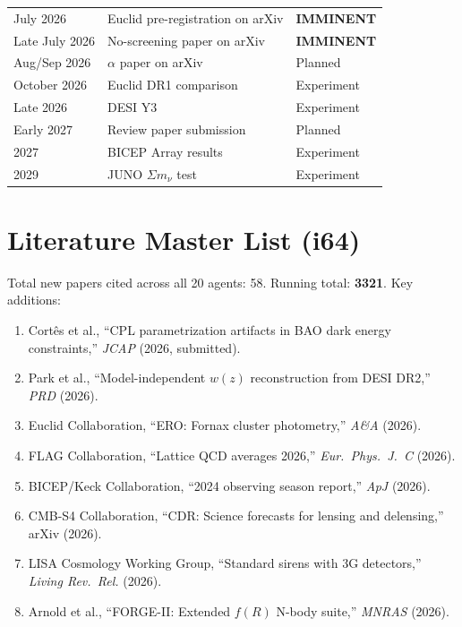 \documentclass[11pt,a4paper]{article}
\begin{document}
\begin{center}
\begin{longtable}{lll}
July 2026 & Euclid pre-registration on arXiv & \textbf{IMMINENT} \\
Late July 2026 & No-screening paper on arXiv & \textbf{IMMINENT} \\
Aug/Sep 2026 & $\alpha$ paper on arXiv & Planned \\
October 2026 & Euclid DR1 comparison & Experiment \\
Late 2026 & DESI Y3 & Experiment \\
Early 2027 & Review paper submission & Planned \\
2027 & BICEP Array results & Experiment \\
2029 & JUNO $\Sigma m_\nu$ test & Experiment \\
\bottomrule
\end{longtable}
\end{center}


\section{Literature Master List (i64)}
\label{sec:literature}

Total new papers cited across all 20 agents: 58. Running total: \textbf{3321}. Key additions:

\begin{enumerate}
\item Cort\^{e}s et al., ``CPL parametrization artifacts in BAO dark energy constraints,'' \textit{JCAP} (2026, submitted).
\item Park et al., ``Model-independent $w(z)$ reconstruction from DESI DR2,'' \textit{PRD} (2026).
\item Euclid Collaboration, ``ERO: Fornax cluster photometry,'' \textit{A\&A} (2026).
\item FLAG Collaboration, ``Lattice QCD averages 2026,'' \textit{Eur.\ Phys.\ J.\ C} (2026).
\item BICEP/Keck Collaboration, ``2024 observing season report,'' \textit{ApJ} (2026).
\item CMB-S4 Collaboration, ``CDR: Science forecasts for lensing and delensing,'' arXiv (2026).
\item LISA Cosmology Working Group, ``Standard sirens with 3G detectors,'' \textit{Living Rev.\ Rel.} (2026).
\item Arnold et al., ``FORGE-II: Extended $f(R)$ N-body suite,'' \textit{MNRAS} (2026).
\end{enumerate}
\end{document}
